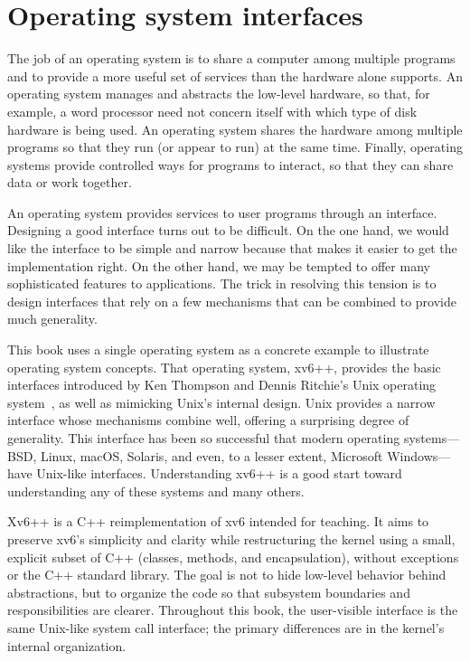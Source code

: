\chapter{Operating system interfaces}
\label{CH:UNIX}

The job of an operating system is to share a computer among
multiple programs and to provide a more useful set of services
than the hardware alone supports.
An operating system manages and abstracts
the low-level hardware, so that, for example,
a word processor need not concern itself with which type
of disk hardware is being used.
An operating system shares the hardware among multiple programs so
that they run (or appear to run) at the same time.
Finally, operating systems provide controlled ways for programs
to interact, so that they can share data or work together.

An operating system provides services to user programs through an interface.
Designing a good interface turns out to be
difficult.  On the one hand, we would like the interface to be
simple and narrow because that makes it easier to get the
implementation right.  On the other hand,
we may be tempted to offer many sophisticated features to applications.
The trick in
resolving this tension is to design interfaces that rely on a few
mechanisms that can be combined to provide much generality.

This book uses a single operating system as a concrete example to
illustrate operating system concepts.  That operating system,
xv6++, provides the basic interfaces introduced by Ken Thompson and
Dennis Ritchie's Unix operating system~\cite{unix}, as well as mimicking Unix's
internal design.  Unix provides a
narrow interface whose mechanisms combine well, offering a surprising
degree of generality.  This interface has been so successful that
modern operating systems—BSD, Linux, macOS, Solaris, and even, to a
lesser extent, Microsoft Windows—have Unix-like interfaces.
Understanding xv6++ is a good start toward understanding any of these
systems and many others.

Xv6++ is a C++ reimplementation of xv6 intended for teaching.
It aims to preserve xv6's simplicity and clarity while restructuring
the kernel using a small, explicit subset of C++ (classes, methods, and
encapsulation), without exceptions or the C++ standard library.
The goal is not to hide low-level behavior behind abstractions, but to
organize the code so that subsystem boundaries and responsibilities are
clearer.  Throughout this book, the user-visible interface is the same
Unix-like system call interface; the primary differences are in the
kernel's internal organization.

